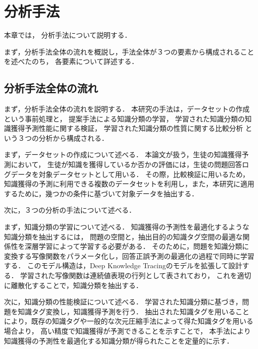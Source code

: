 \chapter{分析手法}
\label{chap:method}
\fancyhf{}
\rhead{\thepage}
\cfoot{\thepage}
本章では，
分析手法について説明する．

まず，分析手法全体の流れを概説し，手法全体が３つの要素から構成されることを述べたのち，
各要素について詳述する．

\vvspace


\section{分析手法全体の流れ}
まず，分析手法全体の流れを説明する．
本研究の手法は，データセットの作成という事前処理と，
提案手法による知識分類の学習，
学習された知識分類の知識獲得予測性能に関する検証，
学習された知識分類の性質に関する比較分析
という３つの分析から構成される．


まず，データセットの作成について述べる．
本論文が扱う，生徒の知識獲得予測において，
生徒が知識を獲得しているか否かの評価には，生徒の問題回答ログデータを対象データセットとして用いる．
その際，比較検証に用いるため，
知識獲得の予測に利用できる複数のデータセットを利用し，また，本研究に適用するために，幾つかの条件に基づいて対象データを抽出する．


次に，３つの分析の手法について述べる．

まず，知識分類の学習について述べる．
知識獲得の予測性を最適化するような知識分類を抽出するには，
問題の空間と，抽出目的の知識タグ空間の最適な関係性を深層学習によって学習する必要がある．
そのために，問題を知識分類に変換する写像関数をパラメータ化し，回答正誤予測の最適化の過程で同時に学習する．
このモデル構造は，Deep Knowledge Tracingのモデルを拡張して設計する．
学習された写像関数は連続値表現の行列として表されており，
これを適切に離散化することで，知識分類を抽出する．

次に，知識分類の性能検証について述べる．
学習された知識分類に基づき，問題を知識タグ変換し，知識獲得予測を行う．
抽出された知識タグを用いることにより，既存の知識タグや一般的な次元圧縮手法によって得た知識タグを用いる場合より，
高い精度で知識獲得が予測できることを示すことで，
本手法により知識獲得の予測性を最適化する知識分類が得られたことを定量的に示す．

